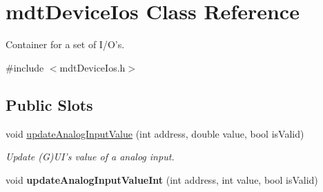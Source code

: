 \hypertarget{classmdt_device_ios}{
\section{mdtDeviceIos Class Reference}
\label{classmdt_device_ios}
}


Container for a set of I/O's.  




{\ttfamily \#include $<$mdtDeviceIos.h$>$}

\subsection*{Public Slots}
\begin{DoxyCompactItemize}
\item 
void \hyperlink{classmdt_device_ios_a1ddb8113380483dc88e4472875cd879d}{updateAnalogInputValue} (int address, double value, bool isValid)
\begin{DoxyCompactList}\small\item\em Update (G)UI's value of a analog input. \end{DoxyCompactList}\item 
\hypertarget{classmdt_device_ios_a91c883cd29bfee659d536362b3553a9f}{
void {\bfseries updateAnalogInputValueInt} (int address, int value, bool isValid)}
\label{classmdt_device_ios_a91c883cd29bfee659d536362b3553a9f}


\end{DoxyCompactItemize}
